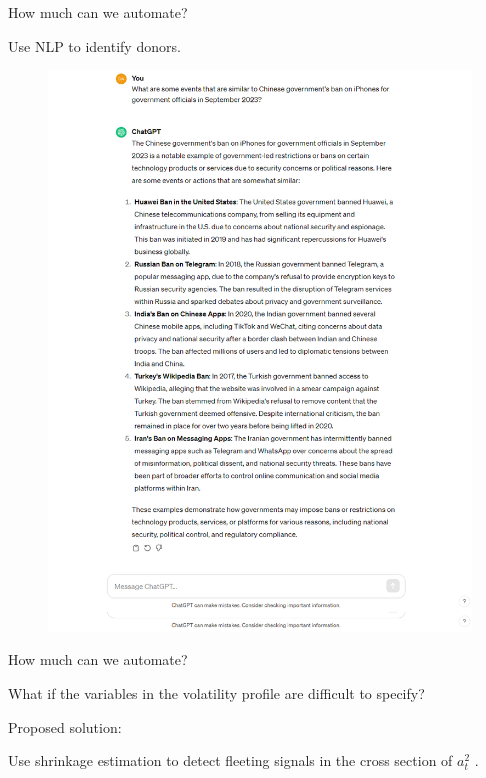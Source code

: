 \documentclass[9pt]{beamer}
\theoremstyle{definition}
\begin{document}
\begin{frame}{How much can we automate?}

Use NLP to identify donors.

\begin{figure}[H]
    \begin{center}
      \includegraphics[scale=.18]{iphone.png}
      \end{center}
    \end{figure}


\end{frame}

\begin{frame}{How much can we automate?}

    What if the variables in the volatility profile are difficult to specify?

    \bigbreak
    Proposed solution:

    \bigbreak

    Use shrinkage estimation to detect fleeting signals in the cross section of $a_{t}^{2}$ \parencite[][]{chinco2019sparse}. 
\end{frame}
\end{document}
